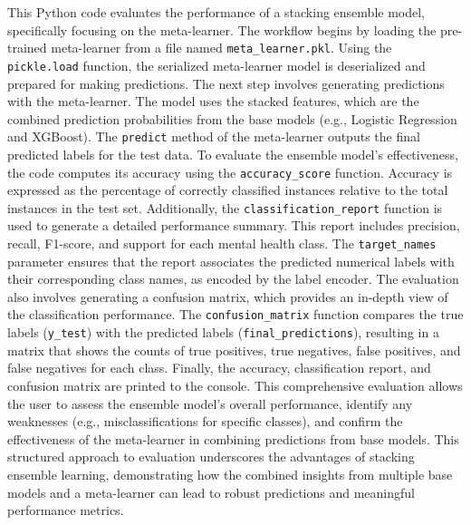 \noindent
This Python code evaluates the performance of a stacking ensemble model, specifically focusing on the meta-learner. The workflow begins by loading the pre-trained meta-learner from a file named \texttt{meta\_learner.pkl}. Using the \texttt{pickle.load} function, the serialized meta-learner model is deserialized and prepared for making predictions. The next step involves generating predictions with the meta-learner. The model uses the stacked features, which are the combined prediction probabilities from the base models (e.g., Logistic Regression and XGBoost). The \texttt{predict} method of the meta-learner outputs the final predicted labels for the test data. To evaluate the ensemble model's effectiveness, the code computes its accuracy using the \texttt{accuracy\_score} function. Accuracy is expressed as the percentage of correctly classified instances relative to the total instances in the test set. Additionally, the \texttt{classification\_report} function is used to generate a detailed performance summary. This report includes precision, recall, F1-score, and support for each mental health class. The \texttt{target\_names} parameter ensures that the report associates the predicted numerical labels with their corresponding class names, as encoded by the label encoder. The evaluation also involves generating a confusion matrix, which provides an in-depth view of the classification performance. The \texttt{confusion\_matrix} function compares the true labels (\texttt{y\_test}) with the predicted labels (\texttt{final\_predictions}), resulting in a matrix that shows the counts of true positives, true negatives, false positives, and false negatives for each class. Finally, the accuracy, classification report, and confusion matrix are printed to the console. This comprehensive evaluation allows the user to assess the ensemble model's overall performance, identify any weaknesses (e.g., misclassifications for specific classes), and confirm the effectiveness of the meta-learner in combining predictions from base models. This structured approach to evaluation underscores the advantages of stacking ensemble learning, demonstrating how the combined insights from multiple base models and a meta-learner can lead to robust predictions and meaningful performance metrics.

\vspace{1em}

